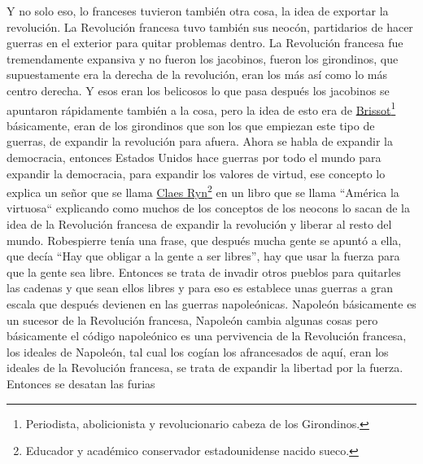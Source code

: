 Y no solo eso, lo franceses tuvieron también otra cosa, la idea de exportar la revolución. La Revolución francesa tuvo también sus neocón, partidarios de hacer guerras en el exterior para quitar problemas dentro. La Revolución francesa fue tremendamente expansiva y no fueron los jacobinos, fueron los girondinos, que supuestamente era la derecha
de la revolución, eran los más así como lo más centro derecha. Y esos eran los belicosos lo que pasa después los jacobinos se apuntaron rápidamente también a la cosa, pero la idea de esto era de \href{https://en.wikipedia.org/wiki/Jacques_Pierre_Brissot}{Brissot}\footnote{Periodista, abolicionista y revolucionario cabeza de los Girondinos.} básicamente, eran de los girondinos que son los que empiezan este tipo de guerras, de expandir la revolución para afuera. Ahora se habla de expandir la democracia, entonces Estados Unidos hace guerras por todo el mundo para expandir la democracia, para expandir los valores de virtud, ese concepto lo explica un señor que se llama \href{https://en.wikipedia.org/wiki/Claes_G._Ryn}{Claes Ryn}\footnote{Educador y académico conservador estadounidense nacido sueco.} en un libro que se llama ``América la virtuosa``\citep{ryn2003america} explicando como muchos de los conceptos de los neocons lo sacan de la idea de la Revolución francesa de expandir la revolución y liberar al resto del mundo. Robespierre tenía una frase, que después mucha gente se apuntó a ella, que decía \enquote{Hay que obligar a la gente a ser libres}, hay que usar la fuerza para que la gente sea libre. Entonces se trata de invadir otros pueblos para quitarles las cadenas y que sean ellos libres y para eso es establece unas guerras a gran escala que después devienen en las guerras napoleónicas. Napoleón básicamente es un sucesor de la Revolución francesa, Napoleón cambia algunas cosas pero básicamente el código napoleónico es una pervivencia de la Revolución francesa, los ideales de Napoleón, tal cual los cogían los afrancesados de aquí, eran los ideales de la Revolución francesa, se trata de expandir la libertad por la fuerza. Entonces se desatan las furias

